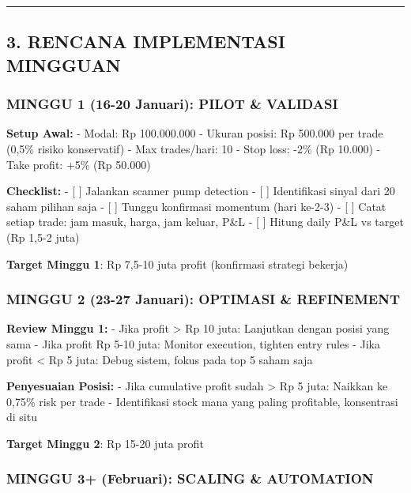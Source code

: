 \documentclass[
  10pt,
  a4paper,
]{article}
\begin{document}
\begin{center}\rule{0.5\linewidth}{0.5pt}\end{center}

\subsection{3. RENCANA IMPLEMENTASI
MINGGUAN}\label{rencana-implementasi-mingguan}

\subsubsection{\texorpdfstring{\textbf{MINGGU 1 (16-20 Januari): PILOT
\&
VALIDASI}}{MINGGU 1 (16-20 Januari): PILOT \& VALIDASI}}\label{minggu-1-16-20-januari-pilot-validasi}

\textbf{Setup Awal:} - Modal: Rp 100.000.000 - Ukuran posisi: Rp 500.000
per trade (0,5\% risiko konservatif) - Max trades/hari: 10 - Stop loss:
-2\% (Rp 10.000) - Take profit: +5\% (Rp 50.000)

\textbf{Checklist:} - {[} {]} Jalankan scanner pump detection - {[} {]}
Identifikasi sinyal dari 20 saham pilihan saja - {[} {]} Tunggu
konfirmasi momentum (hari ke-2-3) - {[} {]} Catat setiap trade: jam
masuk, harga, jam keluar, P\&L - {[} {]} Hitung daily P\&L vs target (Rp
1,5-2 juta)

\textbf{Target Minggu 1}: Rp 7,5-10 juta profit (konfirmasi strategi
bekerja)

\subsubsection{\texorpdfstring{\textbf{MINGGU 2 (23-27 Januari):
OPTIMASI \&
REFINEMENT}}{MINGGU 2 (23-27 Januari): OPTIMASI \& REFINEMENT}}\label{minggu-2-23-27-januari-optimasi-refinement}

\textbf{Review Minggu 1:} - Jika profit \textgreater{} Rp 10 juta:
Lanjutkan dengan posisi yang sama - Jika profit Rp 5-10 juta: Monitor
execution, tighten entry rules - Jika profit \textless{} Rp 5 juta:
Debug sistem, fokus pada top 5 saham saja

\textbf{Penyesuaian Posisi:} - Jika cumulative profit sudah
\textgreater{} Rp 5 juta: Naikkan ke 0,75\% risk per trade -
Identifikasi stock mana yang paling profitable, konsentrasi di situ

\textbf{Target Minggu 2}: Rp 15-20 juta profit

\subsubsection{\texorpdfstring{\textbf{MINGGU 3+ (Februari): SCALING \&
AUTOMATION}}{MINGGU 3+ (Februari): SCALING \& AUTOMATION}}\label{minggu-3-februari-scaling-automation}
\end{document}
